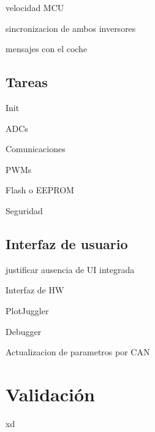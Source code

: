 velocidad MCU

sincronizacion de ambos inversores

mensajes con el coche

\subsection{Tareas}

Init

ADCs

Comunicaciones

PWMs

Flash o EEPROM

Seguridad

\subsection{Interfaz de usuario}

justificar ausencia de UI integrada

Interfaz de HW 

PlotJuggler

Debugger

Actualizacion de parametros por CAN

\section{Validación}
xd

